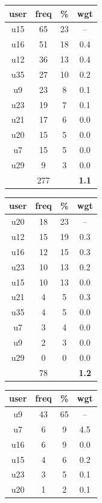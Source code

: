 \begin{table}
\centering
\begin{tabular}{ |c|c|c|c| }
	\hline
	\textbf{user} & \textbf{freq} & \textbf{\%} & \textbf{wgt} \\
	\hline
	u15 & 65 & 23 & -- \\
	u16 & 51 & 18 & 0.4 \\
	u12 & 36 & 13 & 0.4 \\
	u35 & 27 & 10 & 0.2 \\
	u9 & 23 & 8 & 0.1 \\
	u23 & 19 & 7 & 0.1 \\
	u21 & 17 & 6 & 0.0 \\
	u20 & 15 & 5 & 0.0 \\
	u7 & 15 & 5 & 0.0 \\
	u29 & 9 & 3 & 0.0 \\
	 & 277 & & \textbf{1.1} \\
	\hline
\end{tabular}
\begin{tabular}{ |c|c|c|c| }
	\hline
	\textbf{user} & \textbf{freq} & \textbf{\%} & \textbf{wgt} \\
	\hline
	u20 & 18 & 23 & -- \\
	u12 & 15 & 19 & 0.3 \\
	u16 & 12 & 15 & 0.3 \\
	u23 & 10 & 13 & 0.2 \\
	u15 & 10 & 13 & 0.0 \\
	u21 & 4 & 5 & 0.3 \\
	u35 & 4 & 5 & 0.0 \\
	u7 & 3 & 4 & 0.0 \\
	u9 & 2 & 3 & 0.0 \\
	u29 & 0 & 0 & 0.0 \\
	 & 78 & & \textbf{1.2} \\
	\hline
\end{tabular}
\begin{tabular}{ |c|c|c|c| }
	\hline
	\textbf{user} & \textbf{freq} & \textbf{\%} & \textbf{wgt} \\
	\hline
	u9 & 43 & 65 & -- \\
	u7 & 6 & 9 & 4.5 \\
	u16 & 6 & 9 & 0.0 \\
	u15 & 4 & 6 & 0.2 \\
	u23 & 3 & 5 & 0.1 \\
	u20 & 1 & 2 & 0.1 \\

\end{tabular}
\end{table}
